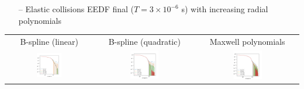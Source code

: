 \documentclass[landscape,archE,fontscale=0.285]{baposter} %
\begin{document}
\begin{poster}
{  \begin{itemize}[leftmargin=*]
    \item [--] Elastic collisions EEDF final ($T=3\times 10^{-6}$ s) with increasing radial polynomials
  \end{itemize}
  \begin{tabular}{ccc}
    B-spline (linear) & B-spline (quadratic)  & Maxwell polynomials \\
    \includegraphics[width=0.3\textwidth]{img/g0_bspline_linear_eedf.png} &
    \includegraphics[width=0.3\textwidth]{img/g0_bspline_quad_eedf.png} &
    \includegraphics[width=0.3\textwidth]{img/g0_maxwell_eedf.png} \\
  \end{tabular}

}
\end{poster}
\end{document}
